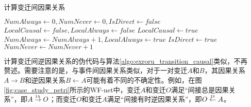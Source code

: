 \begin{algorithm}[htbp]
  \LinesNumbered
  \caption{计算变迁间因果关系}
  \label{algo:exroru_transition_causal}
  $NumAlways\leftarrow 0,NumNever\leftarrow 0,IsDirect\leftarrow false$\;
   {
  $LocalCausal\leftarrow false,LocalAlways\leftarrow false$\;
   {
       {
        $LocalCausal\leftarrow true$\;
      }
     {
    $NumAlways\leftarrow NumAlways+1,LocalAlways\leftarrow true$\;
    }
     {
      $IsDirect\leftarrow true$\;
    }
  }
   {
    $NumNever\leftarrow NumNever+1$\;
  }
  }
   {
  }  {
  }  {
  }  {
  } 
\end{algorithm}

计算变迁间逆因果关系的伪代码与算法\ref{algo:exroru_transition_causal}类似，不再赘述。需要注意的是，与事件间因果关系类似，对于一对变迁$A$和$B$，其因果关系$A\rightarrow B$和逆因果关系$B\leftarrow A$可能有着不同的不确定性。例如，在图\ref{fig:case_study_petri}所示的WF-net中，变迁$A$和变迁$O$满足“间接总是因果关系”，即$A\overset{\text{\tiny{IA}}}{\rightarrow}O$；而变迁$O$和变迁$A$满足“间接有时逆因果关系”，即$O\overset{\text{\tiny{IS}}}{\leftarrow}A$。

